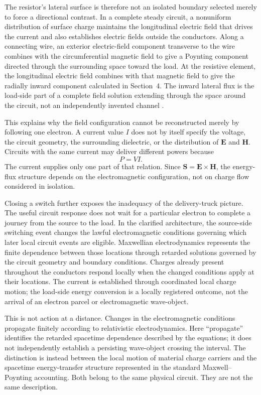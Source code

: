 \documentclass[12pt,onecolumn]{article}
\begin{document}
The resistor's lateral surface is therefore not an isolated boundary selected merely to force a directional contrast. In a complete steady circuit, a nonuniform distribution of surface charge maintains the longitudinal electric field that drives the current and also establishes electric fields outside the conductors. Along a connecting wire, an exterior electric-field component transverse to the wire combines with the circumferential magnetic field to give a Poynting component directed through the surrounding space toward the load. At the resistive element, the longitudinal electric field combines with that magnetic field to give the radially inward component calculated in Section~4. The inward lateral flux is the load-side part of a complete field solution extending through the space around the circuit, not an independently invented channel \cite{jackson1996,majcen2000,galili2005,davis2011}.

This explains why the field configuration cannot be reconstructed merely by following one electron. A current value $I$ does not by itself specify the voltage, the circuit geometry, the surrounding dielectric, or the distribution of $\mathbf E$ and $\mathbf H$. Circuits with the same current may deliver different powers because
\[
P=VI.
\]
The current supplies only one part of that relation. Since $\mathbf S=\mathbf E\times\mathbf H$, the energy-flux structure depends on the electromagnetic configuration, not on charge flow considered in isolation.

Closing a switch further exposes the inadequacy of the delivery-truck picture. The useful circuit response does not wait for a particular electron to complete a journey from the source to the load. In the clarified architecture, the source-side switching event changes the lawful electromagnetic conditions governing which later local circuit events are eligible. Maxwellian electrodynamics represents the finite dependence between those locations through retarded solutions governed by the circuit geometry and boundary conditions. Charges already present throughout the conductors respond locally when the changed conditions apply at their locations. The current is established through coordinated local charge motion; the load-side energy conversion is a locally registered outcome, not the arrival of an electron parcel or electromagnetic wave-object.

This is not action at a distance. Changes in the electromagnetic conditions propagate finitely according to relativistic electrodynamics. Here ``propagate'' identifies the retarded spacetime dependence described by the equations; it does not independently establish a persisting wave-object crossing the interval. The distinction is instead between the local motion of material charge carriers and the spacetime energy-transfer structure represented in the standard Maxwell--Poynting accounting. Both belong to the same physical circuit. They are not the same description.
\end{document}
